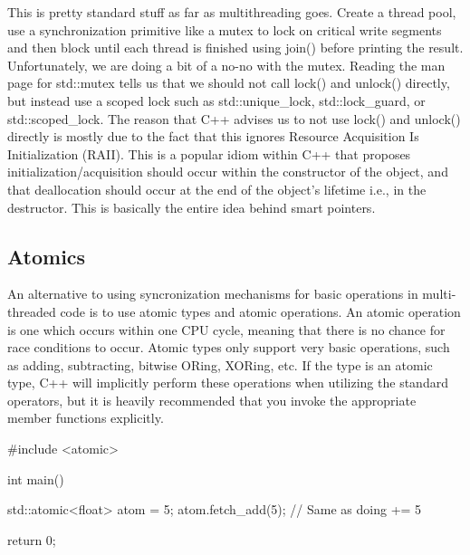 \documentclass{article}
\begin{document}
This is pretty standard stuff as far as multithreading goes. Create a thread pool, use a synchronization
primitive like a mutex to lock on critical write segments and then block until each thread is finished using
join() before printing the result. Unfortunately, we are doing a bit of a no-no with the mutex. Reading the
man page for std::mutex tells us that we should not call lock() and unlock() directly, but instead use a
scoped lock such as std::unique\_lock, std::lock\_guard, or std::scoped\_lock. The reason that C++ advises us
to not use lock() and unlock() directly is mostly due to the fact that this ignores Resource Acquisition Is
Initialization (RAII). This is a popular idiom within C++ that proposes initialization/acquisition should
occur within the constructor of the object, and that deallocation should occur at the end of the object's
lifetime i.e., in the destructor. This is basically the entire idea behind smart pointers.

\subsection{Atomics}

An alternative to using syncronization mechanisms for basic operations in multi-threaded code is to use
atomic types and atomic operations. An atomic operation is one which occurs within one CPU cycle, meaning that
there is no chance for race conditions to occur. Atomic types only support very basic operations, such as
adding, subtracting, bitwise ORing, XORing, etc. If the type is an atomic type, C++ will implicitly perform
these operations when utilizing the standard operators, but it is heavily recommended that you invoke
the appropriate member functions explicitly.

\begin{cpplst}

#include <atomic>

int main()
{
    std::atomic<float> atom = 5;
    atom.fetch_add(5); // Same as doing += 5

    return 0;
}

\end{cpplst}
\end{document}
